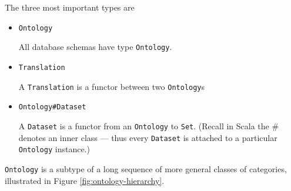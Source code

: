 \documentclass{amsart}
\newcommand{\type}[1]{{\tt #1}}
\begin{document}
The three most important types are
\begin{itemize}
\item {\color{gray}\type{net.metaphor.api.}}\type{Ontology}

All database schemas have type \type{Ontology}. 

\item {\color{gray}\type{net.metaphor.api.}}\type{Translation}

A \type{Translation} is a functor between two \type{Ontology}s

\item {\color{gray}\type{net.metaphor.api.}}\type{Ontology\#Dataset}

A \type{Dataset} is a functor from an \type{Ontology} to \type{Set}. 
(Recall in Scala the \# denotes an inner class --- thus every \type{Dataset} is attached to a particular \type{Ontology} instance.) 
\end{itemize}

\type{Ontology} is a subtype of a long sequence of more general classes of categories, illustrated in Figure \ref{fig:ontology-hierarchy}.

\end{document}
